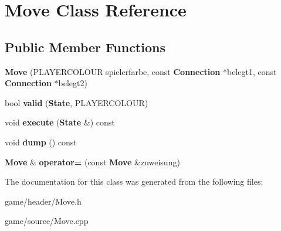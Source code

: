 \section{Move Class Reference}
\label{class_move}
\subsection*{Public Member Functions}
\begin{DoxyCompactItemize}
\item 
{\bfseries Move} (P\-L\-A\-Y\-E\-R\-C\-O\-L\-O\-U\-R spielerfarbe, const {\bf Connection} $\ast$belegt1, const {\bf Connection} $\ast$belegt2)\label{class_move_a19b3a0b7bf30452a999180d3a9cc7391}

\item 
bool {\bfseries valid} ({\bf State}, P\-L\-A\-Y\-E\-R\-C\-O\-L\-O\-U\-R)\label{class_move_a7e7ae3208887d0ff807b48372601b065}

\item 
void {\bfseries execute} ({\bf State} \&) const \label{class_move_ae647057baca3c5d56261887a4eb2206f}

\item 
void {\bfseries dump} () const \label{class_move_a5fd65957977d9e30fd8898fa4a14ac56}

\item 
{\bf Move} \& {\bfseries operator=} (const {\bf Move} \&zuweisung)\label{class_move_a2cae41881447ddc9496cff2800ce01e2}

\end{DoxyCompactItemize}


The documentation for this class was generated from the following files\-:\begin{DoxyCompactItemize}
\item 
game/header/Move.\-h\item 
game/source/Move.\-cpp\end{DoxyCompactItemize}
